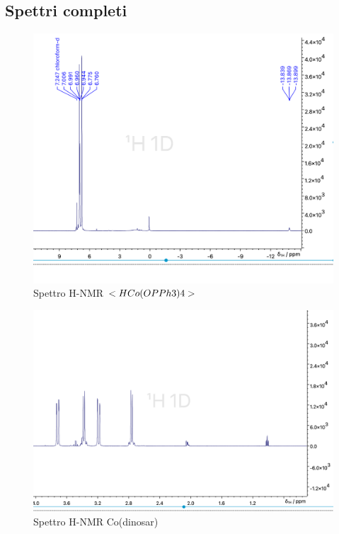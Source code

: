 \begin{appendix}
\clearpage
\section{Spettri completi}

\begin{figure}[h!]
    \centering
    \includegraphics[width=\linewidth]{Relazione/foto/CoH_peak_calcall.png}
    \caption{ Spettro H-NMR
    $<HCo(OPPh3)4 >$ }
    \label{fig:cohfull}
\end{figure}


\begin{figure}[h!]
    \centering
    \includegraphics[width=\linewidth]{Relazione/foto/Dinosar_full.png}
    \caption{Spettro H-NMR Co(dinosar)}
    \label{fig:cohfull}
\end{figure}




\end{appendix}
